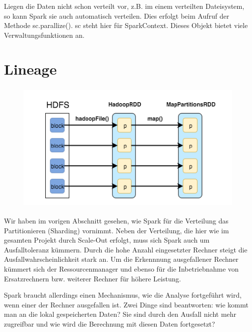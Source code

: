 Liegen die Daten nicht schon verteilt vor, z.B. im einem verteilten
Dateisystem, so kann Spark sie auch automatisch verteilen. Dies erfolgt
beim Aufruf der Methode sc.parallize(). sc steht hier für SparkContext.
Dieses Objekt bietet viele Verwaltungsfunktionen an. 

\section[Lineage]{\rmfamily Lineage}
\begin{figure}
\centering
\includegraphics[width=11.693cm,height=6.428cm]{bilder/Seminartext-img1.png}
\end{figure}
Wir haben im vorigen Abschnitt gesehen, wie Spark für die Verteilung das
Partitionieren (Sharding) vornimmt. Neben der Verteilung, die hier wie
im gesamten Projekt durch Scale-Out erfolgt, muss sich Spark auch um
Ausfalltoleranz kümmern. Durch die hohe Anzahl eingesetzter Rechner
steigt die Ausfallwahrscheinlichkeit stark an. Um die Erkennnung
ausgefallener Rechner kümmert sich der Ressourcenmanager und ebenso für
die Inbetriebnahme von Ersatzrechnern bzw. weiterer Rechner für höhere
Leistung.

Spark braucht allerdings einen Mechanismus, wie die Analyse fortgeführt
wird, wenn einer der Rechner ausgefallen ist. Zwei Dinge sind
beantworten: wie kommt man an die lokal gespeicherten Daten? Sie sind durch
den Ausfall nicht mehr zugreifbar und wie wird die Berechnung mit
diesen Daten fortgesetzt?

